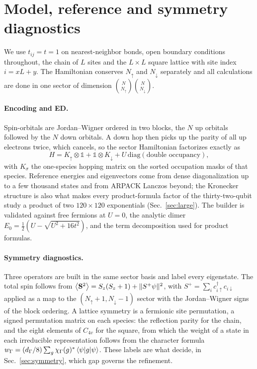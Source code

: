 \documentclass[a4paper,11pt,noarxiv]{quantumarticle}
\begin{document}
\section{Model, reference and symmetry diagnostics}
\label{sec:model}
We use $t_{ij}=t=1$ on nearest-neighbor bonds, open boundary conditions
throughout, the chain of $L$ sites and the $L\times L$ square lattice with
site index $i=xL+y$.  The Hamiltonian conserves $N_\uparrow$ and
$N_\downarrow$ separately and all calculations are done in one sector of
dimension $\binom{N}{N_\uparrow}\binom{N}{N_\downarrow}$.

\paragraph{Encoding and ED.}
Spin-orbitals are Jordan--Wigner ordered in two blocks, the $N$ up orbitals
followed by the $N$ down orbitals.  A down hop then picks up the parity of
all up electrons twice, which cancels, so the sector Hamiltonian factorizes
exactly as
\begin{equation}
  H=K_\uparrow\otimes\mathbb 1+\mathbb 1\otimes K_\downarrow
   +U\,\mathrm{diag}(\text{double occupancy}),
  \label{eq:kron}
\end{equation}
with $K_\sigma$ the one-species hopping matrix on the sorted occupation
masks of that species.  Reference energies and eigenvectors come from dense
diagonalization up to a few thousand states and from ARPACK Lanczos beyond;
the Kronecker structure is also what makes every product-formula factor of
the thirty-two-qubit study a product of two $120\times120$ exponentials
(Sec.~\ref{sec:large}).  The builder is validated against free fermions at
$U=0$, the analytic dimer $E_0=\tfrac12(U-\sqrt{U^2+16t^2})$, and the term
decomposition used for product formulas.

\paragraph{Symmetry diagnostics.}
Three operators are built in the same sector basis and label every
eigenstate.  The total spin follows from
$\expval{\mathbf S^2}=S_z(S_z+1)+\|S^+\psi\|^2$, with
$S^+=\sum_ic^\dagger_{i\uparrow}c_{i\downarrow}$ applied as a map to the
$(N_\uparrow+1,N_\downarrow-1)$ sector with the Jordan--Wigner signs of the
block ordering.  A lattice symmetry is a fermionic site permutation, a signed
permutation matrix on each species: the reflection parity for the chain, and
the eight elements of $C_{4v}$ for the square, from which the weight of a
state in each irreducible representation follows from the character formula
$w_\Gamma=(d_\Gamma/8)\sum_g\chi_\Gamma(g)^*\expval{g}{\psi}$.  These
labels are what decide, in Sec.~\ref{sec:symmetry}, which gap governs the
refinement.
\end{document}
